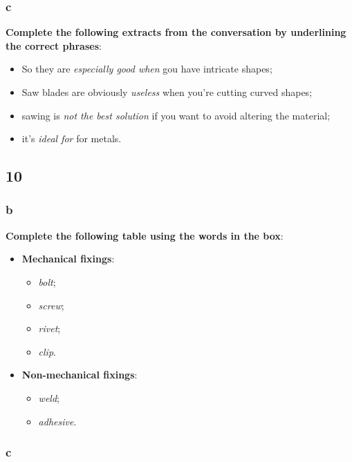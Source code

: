 \subsubsection{c}

\textbf{Complete the following extracts from the conversation by underlining the correct phrases}:

\begin{itemize}

\item So they are \textit{especially good when} gou have intricate shapes;
\item Saw blades are obviously \textit{useless} when you're cutting curved shapes;
\item sawing is \textit{not the best solution} if you want to avoid altering the material;
\item it's \textit{ideal for} for metals. 

\end{itemize}

\subsection{10}

\subsubsection{b}

\textbf{Complete the following table using the words in the box}:

\begin{itemize}

\item{\textbf{Mechanical fixings}}:
\begin{itemize}
\item\textit{bolt};
\item\textit{screw};
\item\textit{rivet};
\item\textit{clip}.
\end{itemize}
\item{\textbf{Non-mechanical fixings}}:
\begin{itemize}
\item\textit{weld};
\item\textit{adhesive}.
\end{itemize}

\end{itemize}

\subsubsection{c}

